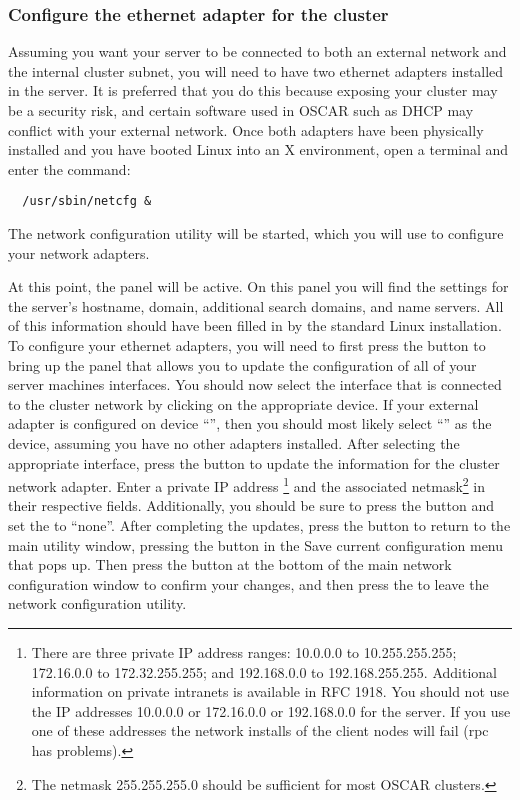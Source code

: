\subsubsection{Configure the ethernet adapter for the cluster} 

Assuming you want your server to be connected to both an external
network and the internal cluster subnet, you will need to have two
ethernet adapters installed in the server. It is preferred that you do
this because exposing your cluster may be a security risk, and certain
software used in OSCAR such as DHCP may conflict with your external
network.  Once both adapters have been physically installed and you
have booted Linux into an X environment, open a terminal and enter the
command:

\begin{verbatim}
  /usr/sbin/netcfg &
\end{verbatim}
  
The network configuration utility will be started, which you will use
to configure your network adapters.
  
At this point, the  panel will be active. On this panel
you will find the settings for the server's hostname, domain,
additional search domains, and name servers. All of this information
should have been filled in by the standard Linux installation. To
configure your ethernet adapters, you will need to first press the
 button to bring up the panel that allows you to
update the configuration of all of your server machines interfaces.
You should now select the interface that is connected to the cluster
network by clicking on the appropriate device. If your external
adapter is configured on device ``'', then you should most
likely select ``'' as the device, assuming you have no
other adapters installed. After selecting the appropriate interface,
press the  button to update the information for the
cluster network adapter. Enter a private IP address
\begchange
\footnote
{
  There are
  three private IP address ranges: 10.0.0.0 to 10.255.255.255;
  172.16.0.0 to 172.32.255.255; and 192.168.0.0 to 192.168.255.255.
  Additional information on private intranets is available in RFC
  1918.
  You should not use the IP addresses 10.0.0.0 or 172.16.0.0 or 
  192.168.0.0 for the server.  If you use one of these addresses 
  the network installs of the client nodes will fail (rpc has 
  problems).
}
\endchange
and the associated netmask\footnote{The netmask
  255.255.255.0 should be sufficient for most OSCAR clusters.}  in
their respective fields. Additionally, you should be sure to press the
 button and set the
 to ``none''.  After
completing the updates, press the  button to return to
the main utility window,
\begchange
pressing the  button in the Save current configuration
menu that pops up.
\endchange
Then press the  button at the bottom of the main network
configuration window to confirm your changes, and then press the
 to leave the network configuration utility.
  
